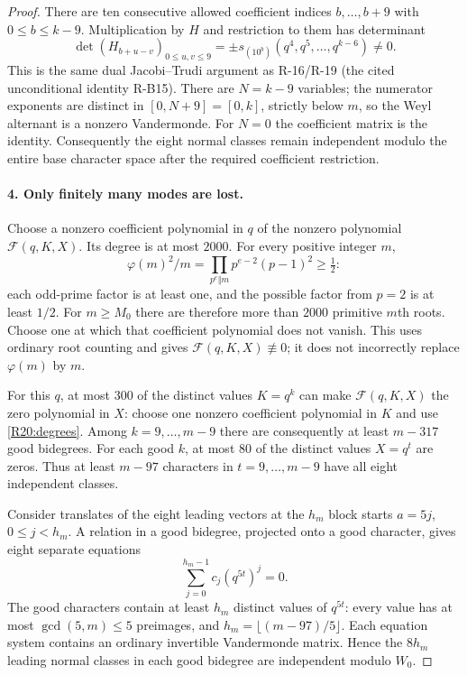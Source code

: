\begin{proof}
There are ten consecutive allowed coefficient indices
$b,\ldots,b+9$ with $0\leq b\leq k-9$.
Multiplication by $H$ and restriction to them has determinant
\[
 \det(H_{b+u-v})_{0\leq u,v\leq9}
 =\pm s_{(10^b)}(q^4,q^5,\ldots,q^{k-6})\ne0.
\]
This is the same dual Jacobi--Trudi argument as R-16/R-19
(the cited unconditional identity R-B15). There are $N=k-9$
variables; the numerator exponents are distinct in $[0,N+9]=[0,k]$,
strictly below $m$, so the Weyl alternant is a nonzero Vandermonde.
For $N=0$ the coefficient matrix is the identity.
Consequently the eight normal classes remain independent modulo
the entire base character space after the required coefficient
restriction.

\paragraph{4. Only finitely many modes are lost.}
Choose a nonzero coefficient polynomial in $q$ of the nonzero
polynomial $\mathscr F(q,K,X)$. Its degree is at most $2000$.
For every positive integer $m$,
\[
 \varphi(m)^2/m
 =\prod_{p^e\Vert m}p^{e-2}(p-1)^2\geq\tfrac12:
\]
each odd-prime factor is at least one, and the possible factor
from $p=2$ is at least $1/2$.
For $m\geq M_0$ there are therefore more than $2000$ primitive
$m$th roots. Choose one at which that coefficient polynomial does
not vanish. This uses ordinary root counting and gives
$\mathscr F(q,K,X)\not\equiv0$; it does not incorrectly replace
$\varphi(m)$ by $m$.

For this $q$, at most $300$ of the distinct values $K=q^k$ can
make $\mathscr F(q,K,X)$ the zero polynomial in $X$: choose one
nonzero coefficient polynomial in $K$ and use
\eqref{R20:degrees}. Among $k=9,\ldots,m-9$ there are consequently
at least $m-317$ good bidegrees. For each good $k$, at most $80$
of the distinct values $X=q^t$ are zeros. Thus at least $m-97$
characters in $t=9,\ldots,m-9$ have all eight independent classes.

Consider translates of the eight leading vectors at the $h_m$
block starts $a=5j$, $0\leq j<h_m$. A relation in a good bidegree,
projected onto a good character, gives eight separate equations
\[
 \sum_{j=0}^{h_m-1}c_j(q^{5t})^j=0.
\]
The good characters contain at least $h_m$ distinct values of
$q^{5t}$: every value has at most $\gcd(5,m)\leq5$ preimages,
and $h_m=\lfloor(m-97)/5\rfloor$.
Each equation system contains an ordinary invertible Vandermonde
matrix. Hence the $8h_m$ leading normal classes in each good
bidegree are independent modulo $W_0$.


\end{proof}
